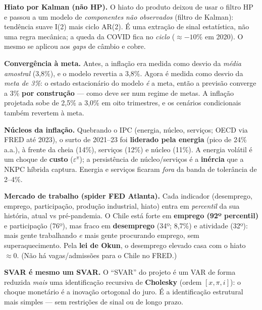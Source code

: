 \documentclass[11pt,a4paper]{article}
\begin{document}
\textbf{Hiato por Kalman (não HP).} O hiato do produto deixou de usar o filtro HP e passou a um modelo
de \emph{componentes não observados} (filtro de Kalman): tendência suave I(2) mais ciclo AR(2). É uma
extração de sinal estatística, não uma regra mecânica; a queda da COVID fica no \emph{ciclo}
($\approx-10\%$ em 2020). O mesmo se aplicou aos \emph{gaps} de câmbio e cobre.

\textbf{Convergência à meta.} Antes, a inflação era medida como desvio da \emph{média amostral}
(3,8\%), e o modelo revertia a 3,8\%. Agora é medida como desvio da \emph{meta de 3\%}: o estado
estacionário do modelo \emph{é} a meta, então a previsão converge a 3\% \textbf{por construção} ---
como deve ser num regime de metas. A inflação projetada sobe de 2,5\% a 3,0\% em oito trimestres, e os
cenários condicionais também revertem à meta.

\textbf{Núcleos da inflação.} Quebrando o IPC (energia, núcleo, serviços; OECD via FRED até 2023), o
surto de 2021--23 foi \textbf{liderado pela energia} (pico de 24\% a.a.), à frente da cheia (14\%),
serviços (12\%) e núcleo (11\%). A energia volátil é um choque de \textbf{custo} ($\varepsilon^\pi$); a
persistência de núcleo/serviços é a \textbf{inércia} que a NKPC híbrida captura. Energia e serviços
ficaram \emph{fora} da banda de tolerância de 2--4\%.

\textbf{Mercado de trabalho (spider FED Atlanta).} Cada indicador (desemprego, emprego, participação,
produção industrial, hiato) entra em \emph{percentil} da sua história, atual vs pré-pandemia. O Chile
está forte em \textbf{emprego (92º percentil)} e participação (76º), mas fraco em \textbf{desemprego}
(34º; 8,7\%) e atividade (32º): mais gente trabalhando \emph{e} mais gente procurando emprego, sem
superaquecimento. Pela \textbf{lei de Okun}, o desemprego elevado casa com o hiato $\approx 0$. (Não há
vagas/admissões para o Chile no FRED.)

\textbf{SVAR é mesmo um SVAR.} O ``SVAR'' do projeto é um VAR de forma reduzida \emph{mais} uma
identificação recursiva de \textbf{Cholesky} (ordem $[x,\pi,i]$): o choque monetário é a inovação
ortogonal do juro. É a identificação estrutural mais simples --- sem restrições de sinal ou de longo
prazo.
\end{document}
